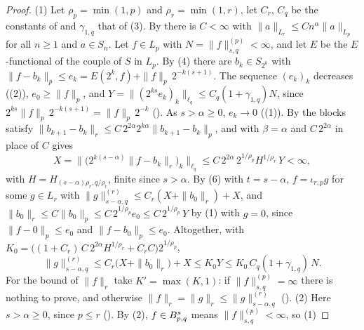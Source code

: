 \begin{proof}
\leanok
{}
(1) Let $\rho_p = \min(1, p)$ and $\rho_r = \min(1, r)$, let $C_r$, $C_q$ be the constants of
 and $\gamma_{1,q}$ that of (3). By
 there is $C < \infty$ with
$\|a\|_{L_r} \leq C n^\alpha \|a\|_{L_p}$ for all $n \geq 1$ and $a \in S_n$. Let $f \in L_p$
with $N = \|f\|^{(p)}_{s, q} < \infty$, and let $E$ be the $E$-functional of the couple of $S$ in
$L_p$. By (4) there are $b_k \in S_{2^k}$ with
$\|f - b_k\|_p \leq e_k = E(2^k, f) + \|f\|_p \, 2^{-k(s+1)}$. The sequence $(e_k)_k$ decreases
((2)), $e_0 \geq \|f\|_p$, and
$Y = \|(2^{ks} e_k)_k\|_{\ell_q} \leq C_q (1 + \gamma_{1,q}) N$, since
$2^{ks} \|f\|_p \, 2^{-k(s+1)} = \|f\|_p \, 2^{-k}$ ().
As $s > \alpha \geq 0$, $e_k \to 0$ ((1)). By
 the blocks satisfy
$\|b_{k+1} - b_k\|_r \leq C \, 2^{2\alpha} 2^{k\alpha} \|b_{k+1} - b_k\|_p$, and
 with $\beta = \alpha$ and $C \, 2^{2\alpha}$ in place of $C$ gives
\[
  X = \bigl\|\bigl(2^{k(s-\alpha)} \|f - b_k\|_r\bigr)_k\bigr\|_{\ell_q}
  \leq C \, 2^{2\alpha} \, 2^{1/\rho_p} H^{1/\rho_r} \, Y < \infty ,
\]
with $H = H_{(s-\alpha)\rho_r, q/\rho_r}$, finite since $s > \alpha$. By
(6) with $t = s - \alpha$, $f = \iota_{r,p} g$ for some $g \in L_r$
with $\|g\|^{(r)}_{s - \alpha, q} \leq C_r (X + \|b_0\|_r) + X$, and
$\|b_0\|_r \leq C \|b_0\|_p \leq C \, 2^{1/\rho_p} e_0 \leq C \, 2^{1/\rho_p} \, Y$ by
(1) with $g = 0$, since $\|f - 0\|_p \leq e_0$ and
$\|f - b_0\|_p \leq e_0$. Altogether, with
$K_0 = \bigl((1 + C_r) \, C \, 2^{2\alpha} H^{1/\rho_r} + C_r C\bigr) 2^{1/\rho_p}$,
\[
  \|g\|^{(r)}_{s - \alpha, q} \leq C_r \bigl(X + \|b_0\|_r\bigr) + X \leq K_0 Y
  \leq K_0 \, C_q (1 + \gamma_{1,q}) \, N .
\]
For the bound of $\|f\|_r$ take $K' = \max(K, 1)$: if $\|f\|^{(p)}_{s, q} = \infty$ there is
nothing to prove, and otherwise $\|f\|_r = \|g\|_r \leq \|g\|^{(r)}_{s - \alpha, q}$
().
(2) Here $s > \alpha \geq 0$, since $p \leq r$ (). By
(2), $f \in B^{s}_{p,q}$ means $\|f\|^{(p)}_{s, q} < \infty$, so (1)

\end{proof}
